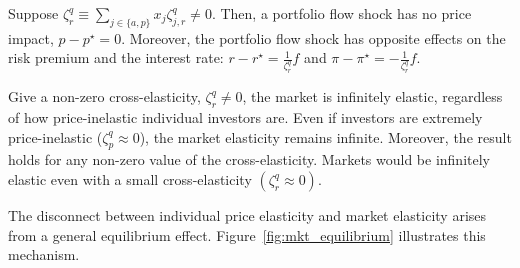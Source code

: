 \begin{prop}
    Suppose $\zeta_r^q \equiv \sum_{j\in\{a,p\}} x_j \zeta_{j,r}^q \neq 0$. Then, a portfolio flow shock has no price impact, $p -p^\star = 0$. Moreover, the portfolio flow shock has opposite effects on the risk premium and the interest rate: $r - r^\star = \frac{1}{\zeta_r^q} f$ and $\pi - \pi^\star = - \frac{1}{\zeta_r^q} f$. 
\end{prop}
Give a non-zero cross-elasticity, $\zeta_{r}^q \neq 0$, the market is infinitely elastic, regardless of how price-inelastic individual investors are.
Even if investors are extremely price-inelastic ($\zeta_p^q \approx 0$), the market elasticity remains infinite. 
Moreover, the result holds for any non-zero value of the cross-elasticity. 
Markets would be infinitely elastic even with a small cross-elasticity $(\zeta^q_r \approx 0)$. 

The disconnect between individual price elasticity and market elasticity arises from a general equilibrium effect. Figure~\ref{fig:mkt_equilibrium} illustrates this mechanism.

